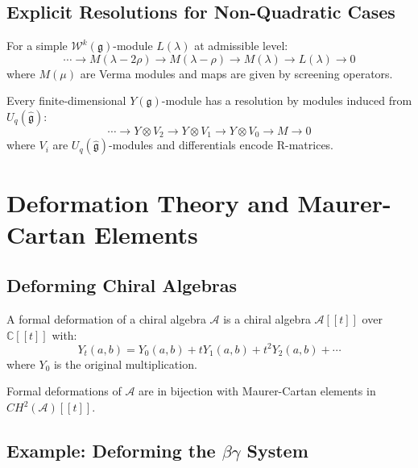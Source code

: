 \subsection{Explicit Resolutions for Non-Quadratic Cases}

\begin{example}
For a simple $\mathcal{W}^k(\mathfrak{g})$-module $L(\lambda)$ at admissible level:
\[
\cdots \to M(\lambda - 2\rho) \to M(\lambda - \rho) \to M(\lambda) \to L(\lambda) \to 0
\]
where $M(\mu)$ are Verma modules and maps are given by screening operators.
\end{example}

\begin{example}
Every finite-dimensional $Y(\mathfrak{g})$-module has a resolution by modules induced from $U_q(\hat{\mathfrak{g}})$:
\[
\cdots \to Y \otimes V_2 \to Y \otimes V_1 \to Y \otimes V_0 \to M \to 0
\]
where $V_i$ are $U_q(\hat{\mathfrak{g}})$-modules and differentials encode R-matrices.
\end{example}


\section{Deformation Theory and Maurer-Cartan Elements}

\subsection{Deforming Chiral Algebras}

\begin{definition}
A formal deformation of a chiral algebra $\mathcal{A}$ is a chiral algebra $\mathcal{A}[[t]]$ over $\mathbb{C}[[t]]$ with:
\[
Y_t(a,b) = Y_0(a,b) + t Y_1(a,b) + t^2 Y_2(a,b) + \cdots
\]
where $Y_0$ is the original multiplication.
\end{definition}

\begin{theorem}
Formal deformations of $\mathcal{A}$ are in bijection with Maurer-Cartan elements in $CH^2(\mathcal{A})[[t]]$.
\end{theorem}

\subsection{Example: Deforming the $\beta\gamma$ System}

